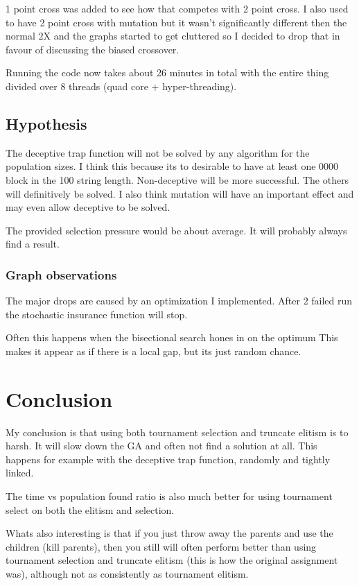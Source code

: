 \documentclass{article}
\begin{document}
\begin{empfile}
1 point cross was added to see how that competes with 2 point cross.
I also used to have 2 point cross with
mutation but it wasn't significantly different then the normal 2X
and the graphs started to get cluttered so I decided to drop that in
favour of discussing the biased crossover.

Running the code now takes about 26 minutes in total with the
entire thing divided over 8 threads (quad core + hyper-threading). 

\subsection{Hypothesis}
The deceptive trap function will not be solved by any algorithm for
the population sizes. I think this because its to desirable to have
at least one 0000 block in the 100 string length.
Non-deceptive will be more successful. The others will definitively be solved.
I also think mutation will have an important effect and may even
allow deceptive to be solved.

The provided selection pressure would be about average.
It will probably always find a result.

\newpage


\subsubsection{Graph observations}
The major drops are caused by an optimization I implemented. After 2 failed
run the stochastic insurance function will stop.

Often this happens when the bisectional search hones in on the optimum
This makes it appear as if there is a local gap, but its just
random chance.

\section{Conclusion}
My conclusion is that using both tournament selection and truncate elitism
is to harsh. It will slow down the GA and often not find a solution at all.
This happens for example with the deceptive trap function, randomly and
tightly linked.

The time vs population found ratio is also much better for using 
tournament select on both the elitism and selection.

Whats also interesting is that if you just throw away the parents and use
the children (kill parents), then you still will often perform better than
using tournament selection and truncate elitism (this is how the original
assignment was), although not as consistently as tournament elitism.


\end{empfile}
\end{document}
